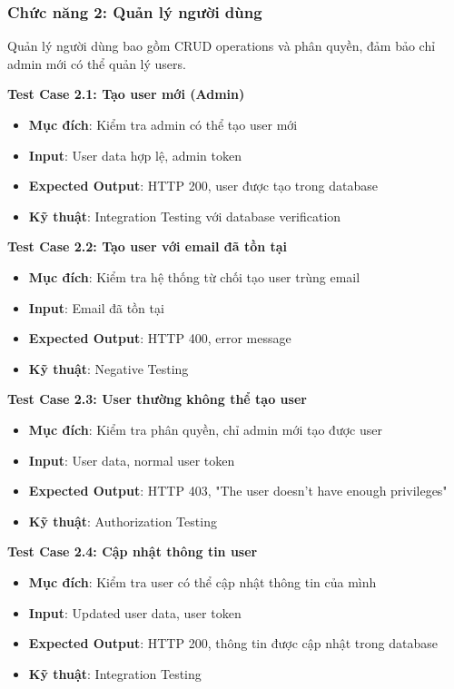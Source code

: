 \documentclass[../DoAn.tex]{subfiles}
\begin{document}
\subsubsection{Chức năng 2: Quản lý người dùng}

Quản lý người dùng bao gồm CRUD operations và phân quyền, đảm bảo chỉ admin mới có thể quản lý users.

\textbf{Test Case 2.1: Tạo user mới (Admin)}
\begin{itemize}
    \item \textbf{Mục đích}: Kiểm tra admin có thể tạo user mới
    \item \textbf{Input}: User data hợp lệ, admin token
    \item \textbf{Expected Output}: HTTP 200, user được tạo trong database
    \item \textbf{Kỹ thuật}: Integration Testing với database verification
\end{itemize}

\textbf{Test Case 2.2: Tạo user với email đã tồn tại}
\begin{itemize}
    \item \textbf{Mục đích}: Kiểm tra hệ thống từ chối tạo user trùng email
    \item \textbf{Input}: Email đã tồn tại
    \item \textbf{Expected Output}: HTTP 400, error message
    \item \textbf{Kỹ thuật}: Negative Testing
\end{itemize}

\textbf{Test Case 2.3: User thường không thể tạo user}
\begin{itemize}
    \item \textbf{Mục đích}: Kiểm tra phân quyền, chỉ admin mới tạo được user
    \item \textbf{Input}: User data, normal user token
    \item \textbf{Expected Output}: HTTP 403, "The user doesn't have enough privileges"
    \item \textbf{Kỹ thuật}: Authorization Testing
\end{itemize}

\textbf{Test Case 2.4: Cập nhật thông tin user}
\begin{itemize}
    \item \textbf{Mục đích}: Kiểm tra user có thể cập nhật thông tin của mình
    \item \textbf{Input}: Updated user data, user token
    \item \textbf{Expected Output}: HTTP 200, thông tin được cập nhật trong database
    \item \textbf{Kỹ thuật}: Integration Testing
\end{itemize}
\end{document}
